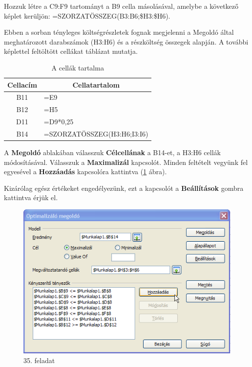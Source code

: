 Hozzuk létre a C9:F9 tartományt a B9 cella másolásával, amelybe a következő
képlet kerüljön: \textsf{=SZORZATÖSSZEG(B3:B6;\$H3:\$H6)}. 

Ebben a sorban tényleges
költségrészletek fognak megjelenni a Megoldó által
meghatározott darabszámok (H3:H6) és a részköltség
összegek alapján. A további képlettel feltöltött cellákat
 táblázat mutatja.

\begin{table}[!h]
\begin{center}
\caption{A cellák tartalma}\label{Feltöltés}
\begin{tabular}{|c|l|}
\hline
\textbf{Cellacím}&
\multicolumn{1}{|c|}{\textbf{Cellatartalom}}\\ \hline
B11 & \sffamily =E9\\ \hline
B12 & \sffamily =H5\\ \hline
D11 & \sffamily =D9*0,25\\ \hline
B14 & \sffamily =SZORZATÖSSZEG(H3:H6;I3:I6)\\ \hline
\end{tabular}
\end{center}
\end{table}

A \textbf{Megoldó} ablakában válasszuk \textbf{Célcellának} a
B14-et, a H3:H6 cellák módosításával. Válasszuk a
\textbf{Maximalizál} kapcsolót. Minden feltételt vegyünk fel
egyesével a \textbf{Hozzáadás} kapcsolóra kattintva (\ref{35-feladat2}
ábra).

Kizárólag egész értékeket engedélyezünk, ezt a kapcsolót
a \textbf{Beállítások} gombra kattintva érjük el.

\begin{figure}[!h]
\begin{center}
\includegraphics[width=12.598cm]{oocalcv2-img171.png}
\caption{35. feladat}\label{35-feladat2}
\end{center}
\end{figure}

